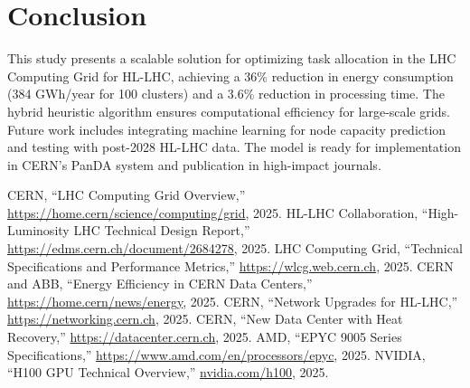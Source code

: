 \documentclass[a4paper,11pt]{article}
\begin{document}

\section{Conclusion}
This study presents a scalable solution for optimizing task allocation in the LHC Computing Grid for HL-LHC, achieving a 36\% reduction in energy consumption (384 GWh/year for 100 clusters) and a 3.6\% reduction in processing time. The hybrid heuristic algorithm ensures computational efficiency for large-scale grids. Future work includes integrating machine learning for node capacity prediction and testing with post-2028 HL-LHC data. The model is ready for implementation in CERN’s PanDA system and publication in high-impact journals.

\begin{thebibliography}{9}
CERN, ``LHC Computing Grid Overview,'' \url{https://home.cern/science/computing/grid}, 2025.
HL-LHC Collaboration, ``High-Luminosity LHC Technical Design Report,'' \url{https://edms.cern.ch/document/2684278}, 2025.
LHC Computing Grid, ``Technical Specifications and Performance Metrics,'' \url{https://wlcg.web.cern.ch}, 2025.
CERN and ABB, ``Energy Efficiency in CERN Data Centers,'' \url{https://home.cern/news/energy}, 2025.
CERN, ``Network Upgrades for HL-LHC,'' 
\url{https://networking.cern.ch}, 2025.
CERN, ``New Data Center with Heat Recovery,'' \url{https://datacenter.cern.ch}, 2025.
AMD, ``EPYC 9005 Series Specifications,'' \url{https://www.amd.com/en/processors/epyc}, 2025.
NVIDIA, ``H100 GPU Technical Overview,'' \href{https://www.nvidia.com/en-us/data-center/h100}{nvidia.com/h100}, 2025.
\end{thebibliography}
\end{document}

